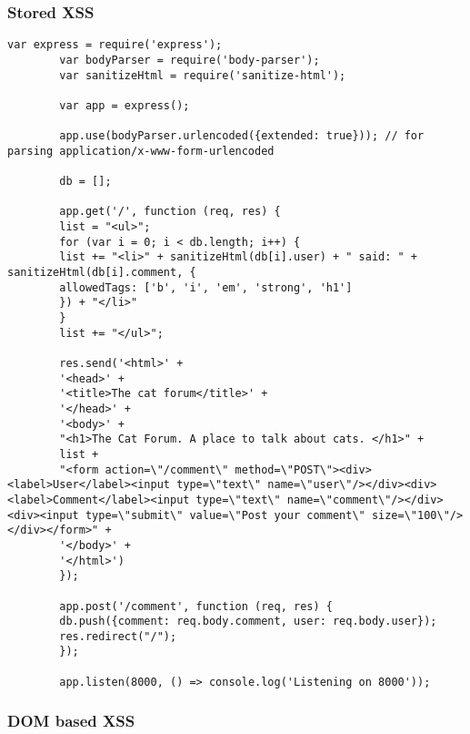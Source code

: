 \begin{Answer}[ref={websec-xss-prevention}]
	\subsubsection{Stored XSS}
		\begin{lstlisting}[style=JavaScript]
		var express = require('express');
		var bodyParser = require('body-parser');
		var sanitizeHtml = require('sanitize-html');
		
		var app = express();
		
		app.use(bodyParser.urlencoded({extended: true})); // for parsing application/x-www-form-urlencoded
		
		db = [];
		
		app.get('/', function (req, res) {
		list = "<ul>";
		for (var i = 0; i < db.length; i++) {
		list += "<li>" + sanitizeHtml(db[i].user) + " said: " + sanitizeHtml(db[i].comment, {
		allowedTags: ['b', 'i', 'em', 'strong', 'h1']
		}) + "</li>"
		}
		list += "</ul>";
		
		res.send('<html>' +
		'<head>' +
		'<title>The cat forum</title>' +
		'</head>' +
		'<body>' +
		"<h1>The Cat Forum. A place to talk about cats. </h1>" +
		list +
		"<form action=\"/comment\" method=\"POST\"><div><label>User</label><input type=\"text\" name=\"user\"/></div><div><label>Comment</label><input type=\"text\" name=\"comment\"/></div><div><input type=\"submit\" value=\"Post your comment\" size=\"100\"/></div></form>" +
		'</body>' +
		'</html>')
		});
		
		app.post('/comment', function (req, res) {
		db.push({comment: req.body.comment, user: req.body.user});
		res.redirect("/");
		});
		
		app.listen(8000, () => console.log('Listening on 8000'));
		\end{lstlisting}
	\subsubsection{DOM based XSS}
	\begin{lstlisting}[style=JavaScript]
	\end{lstlisting}
\end{Answer}